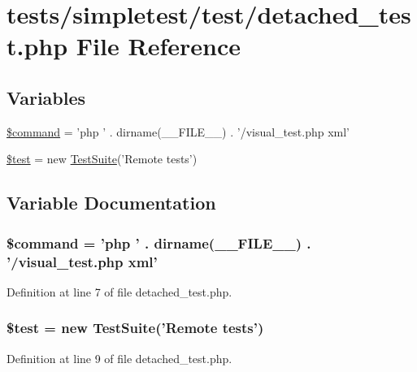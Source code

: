 \hypertarget{detached__test_8php}{\section{tests/simpletest/test/detached\-\_\-test.php File Reference}
\label{detached__test_8php}
}
\subsection*{Variables}
\begin{DoxyCompactItemize}
\item 
\hyperlink{detached__test_8php_a8f120409eb9f635ac30b3f9a6d5becdc}{\$command} = 'php ' . dirname(\-\_\-\-\_\-\-F\-I\-L\-E\-\_\-\-\_\-) . '/visual\-\_\-test.\-php xml'
\item 
\hyperlink{detached__test_8php_a31daebf88fc668f410293e2c70cea3fc}{\$test} = new \hyperlink{class_test_suite}{Test\-Suite}('Remote tests')
\end{DoxyCompactItemize}


\subsection{Variable Documentation}
\hypertarget{detached__test_8php_a8f120409eb9f635ac30b3f9a6d5becdc}{
\subsubsection[{\$command}]{\setlength{\rightskip}{0pt plus 5cm}\$command = 'php ' . dirname(\-\_\-\-\_\-\-F\-I\-L\-E\-\_\-\-\_\-) . '/visual\-\_\-test.\-php xml'}}\label{detached__test_8php_a8f120409eb9f635ac30b3f9a6d5becdc}


Definition at line 7 of file detached\-\_\-test.\-php.

\hypertarget{detached__test_8php_a31daebf88fc668f410293e2c70cea3fc}{
\subsubsection[{\$test}]{\setlength{\rightskip}{0pt plus 5cm}\$test = new {\bf Test\-Suite}('Remote tests')}}\label{detached__test_8php_a31daebf88fc668f410293e2c70cea3fc}


Definition at line 9 of file detached\-\_\-test.\-php.

